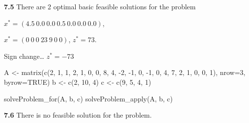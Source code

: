 \documentclass[
]{article}
\newenvironment{Shaded}{\begin{snugshade}}{\end{snugshade}}
\newcommand{\AttributeTok}[1]{\textcolor[rgb]{0.77,0.63,0.00}{#1}}
\newcommand{\ConstantTok}[1]{\textcolor[rgb]{0.00,0.00,0.00}{#1}}
\newcommand{\DecValTok}[1]{\textcolor[rgb]{0.00,0.00,0.81}{#1}}
\newcommand{\FunctionTok}[1]{\textcolor[rgb]{0.00,0.00,0.00}{#1}}
\newcommand{\NormalTok}[1]{#1}
\newcommand{\OtherTok}[1]{\textcolor[rgb]{0.56,0.35,0.01}{#1}}
\newcommand{\SpecialCharTok}[1]{\textcolor[rgb]{0.00,0.00,0.00}{#1}}
\begin{document}
\textbf{7.5} There are 2 optimal basic feasible solutions for the
problem

\(x^*= (4.5\ 0.0\ 0.0\ 0.5\ 0.0\ 0.0\ 0.0)\),

\(x^*= (0\  0\  0\ 23\  9\  0\  0)\), \(z^*= 73\).

Sign change\ldots{} \(z^*= -73\)

\begin{Shaded}
\begin{Highlighting}[]
\NormalTok{A }\OtherTok{\textless{}{-}} \FunctionTok{matrix}\NormalTok{(}\FunctionTok{c}\NormalTok{(}\DecValTok{2}\NormalTok{, }\DecValTok{1}\NormalTok{, }\DecValTok{1}\NormalTok{, }\DecValTok{2}\NormalTok{, }\DecValTok{1}\NormalTok{, }\DecValTok{0}\NormalTok{, }\DecValTok{0}\NormalTok{, }\DecValTok{8}\NormalTok{, }\DecValTok{4}\NormalTok{, }\SpecialCharTok{{-}}\DecValTok{2}\NormalTok{, }\SpecialCharTok{{-}}\DecValTok{1}\NormalTok{, }\DecValTok{0}\NormalTok{, }\SpecialCharTok{{-}}\DecValTok{1}\NormalTok{, }\DecValTok{0}\NormalTok{, }\DecValTok{4}\NormalTok{, }\DecValTok{7}\NormalTok{, }\DecValTok{2}\NormalTok{, }\DecValTok{1}\NormalTok{, }\DecValTok{0}\NormalTok{, }\DecValTok{0}\NormalTok{, }\DecValTok{1}\NormalTok{), }\AttributeTok{nrow=}\DecValTok{3}\NormalTok{, }\AttributeTok{byrow=}\ConstantTok{TRUE}\NormalTok{)}
\NormalTok{b }\OtherTok{\textless{}{-}} \FunctionTok{c}\NormalTok{(}\DecValTok{2}\NormalTok{, }\DecValTok{10}\NormalTok{, }\DecValTok{4}\NormalTok{)}
\NormalTok{c }\OtherTok{\textless{}{-}} \FunctionTok{c}\NormalTok{(}\DecValTok{9}\NormalTok{, }\DecValTok{5}\NormalTok{, }\DecValTok{4}\NormalTok{, }\DecValTok{1}\NormalTok{)}

\FunctionTok{solveProblem\_for}\NormalTok{(A, b, c)}
\FunctionTok{solveProblem\_apply}\NormalTok{(A, b, c)}
\end{Highlighting}
\end{Shaded}

\textbf{7.6} There is no feasible solution for the problem.
\end{document}
